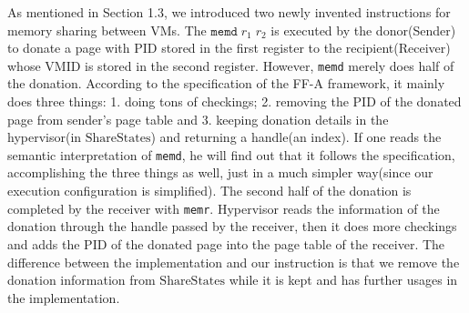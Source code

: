 \documentclass[a4paper]{article}
\newcommand*{\SSS}{\text{ShareStates}}
\newcommand*{\PID}{\text{PID}}
\newcommand*{\VMID}{\text{VMID}}
\newcommand*{\instr}[1]{\texttt{#1}}
\begin{document}
As mentioned in Section 1.3, we introduced two newly invented instructions for
memory sharing between VMs. The $\instr{memd}\; r_{1}\; r_{2}$ is executed by
the donor(Sender) to donate a page with $\PID$ stored in the first register to
the recipient(Receiver) whose $\VMID$ is stored in the second register. However,
\instr{memd} merely does half of the donation. According to the specification of
the FF-A framework, it mainly does three things: 1. doing tons of checkings; 2.
removing the $\PID$ of the donated page from sender's page table and 3. keeping
donation details in the hypervisor(in $\SSS$) and returning a handle(an index).
If one reads the semantic interpretation of \instr{memd}, he will find out that
it follows the specification, accomplishing the three things as well,
just in a much simpler way(since our execution configuration is simplified). The second half of the donation is
completed by the receiver with \instr{memr}. Hypervisor reads the information of
the donation through the handle passed by the receiver, then it does more
checkings and adds the $\PID$ of the donated page into the page table of the
receiver. The difference between the implementation and our
instruction is that we remove the donation information from $\SSS$ while it is
kept and has further usages in the implementation.

\end{document}
